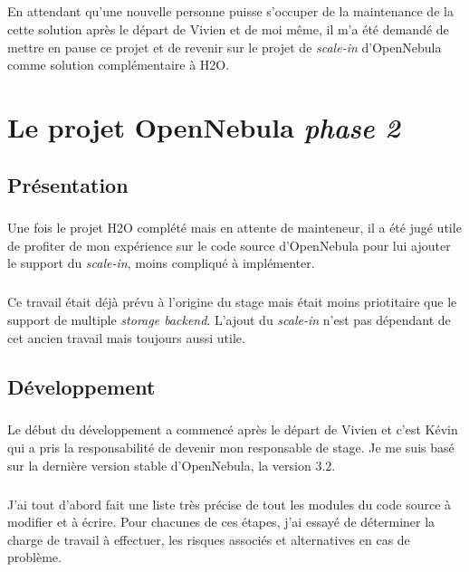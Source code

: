 \paragraph*{}
En attendant qu'une nouvelle personne puisse s'occuper de la maintenance de la cette solution après le départ de Vivien et de moi même, il m'a été demandé de mettre en pause ce projet
et de revenir sur le projet de \emph{scale-in} d'OpenNebula comme solution complémentaire à H2O.


\chapter{Le projet OpenNebula \emph{phase 2}}

\section{Présentation}
\paragraph*{}
Une fois le projet H2O complété mais en attente de mainteneur, il a été jugé utile de profiter de mon expérience sur le code source d'OpenNebula pour lui ajouter
le support du \emph{scale-in}, moins compliqué à implémenter.

\paragraph*{}
Ce travail était déjà prévu à l'origine du stage mais était moins priotitaire que le support de multiple \emph{storage backend}.
L'ajout du \emph{scale-in} n'est pas dépendant de cet ancien travail mais toujours aussi utile.\\

\section{Développement}
\paragraph*{}
Le début du développement a commencé après le départ de Vivien et c'est Kévin qui a pris la responsabilité de devenir mon responsable de stage.
Je me suis basé sur la dernière version stable d'OpenNebula, la version 3.2.

\paragraph*{}
J'ai tout d'abord fait une liste très précise de tout les modules du code source à modifier et à écrire. Pour chacunes de ces étapes, j'ai essayé de déterminer
la charge de travail à effectuer, les risques associés et alternatives en cas de problème.

